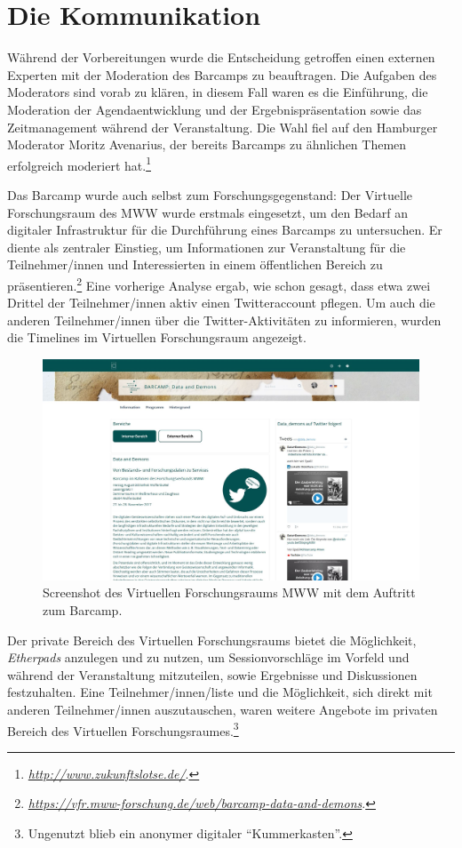\documentclass[a4paper,
fontsize=11pt,
oneside,
numbers=noperiodatend,
parskip=half-,
bibliography=totoc,
final
]{scrartcl}
\begin{document}
\section{Die Kommunikation}\label{die-kommunikation}

Während der Vorbereitungen wurde die Entscheidung getroffen einen
externen Experten mit der Moderation des Barcamps zu beauftragen. Die
Aufgaben des Moderators sind vorab zu klären, in diesem Fall waren es
die Einführung, die Moderation der Agendaentwicklung und der
Ergebnispräsentation sowie das Zeitmanagement während der Veranstaltung.
Die Wahl fiel auf den Hamburger Moderator Moritz Avenarius, der bereits
Barcamps zu ähnlichen Themen erfolgreich moderiert hat.\footnote{\href{http://www.zukunftslotse.de/}{\emph{http://www.zukunftslotse.de/}}.}

Das Barcamp wurde auch selbst zum Forschungsgegenstand: Der Virtuelle
Forschungsraum des MWW wurde erstmals eingesetzt, um den Bedarf an
digitaler Infrastruktur für die Durchführung eines Barcamps zu
untersuchen. Er diente als zentraler Einstieg, um Informationen zur
Veranstaltung für die Teilnehmer/innen und Interessierten in einem
öffentlichen Bereich zu präsentieren.\footnote{\href{https://vfr.mww-forschung.de/web/barcamp-data-and-demons}{\emph{https://vfr.mww-forschung.de/web/barcamp-data-and-demons}}.}
Eine vorherige Analyse ergab, wie schon gesagt, dass etwa zwei Drittel
der Teilnehmer/innen aktiv einen Twitteraccount pflegen. Um auch die
anderen Teilnehmer/innen über die Twitter-Aktivitäten zu informieren,
wurden die Timelines im Virtuellen Forschungsraum angezeigt.

\begin{figure}
\centering
\includegraphics[width=0.7\columnwidth]{img/Abbildung1.jpg}
\caption{Screenshot des Virtuellen Forschungsraums MWW mit dem Auftritt
zum Barcamp.}
\end{figure}

Der private Bereich des Virtuellen Forschungsraums bietet die
Möglichkeit, \emph{Etherpads} anzulegen und zu nutzen, um
Sessionvorschläge im Vorfeld und während der Veranstaltung mitzuteilen,
sowie Ergebnisse und Diskussionen festzuhalten. Eine
Teilnehmer/innen/liste und die Möglichkeit, sich direkt mit anderen
Teilnehmer/innen auszutauschen, waren weitere Angebote im privaten
Bereich des Virtuellen Forschungsraumes.\footnote{Ungenutzt blieb ein
  anonymer digitaler \enquote{Kummerkasten}.}
\end{document}
